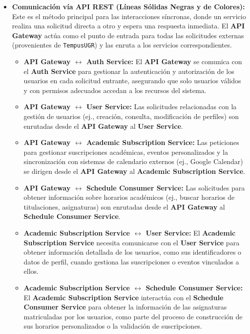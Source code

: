 \begin{itemize}
    \item \textbf{Comunicación vía API REST (Líneas Sólidas Negras y de Colores):}
    Este es el método principal para las interacciones síncronas, donde un servicio realiza una solicitud directa a otro y espera una respuesta inmediata. El \textbf{API Gateway} actúa como el punto de entrada para todas las solicitudes externas (provenientes de \texttt{TempusUGR}) y las enruta a los servicios correspondientes.
    \begin{itemize}
        \item \textbf{API Gateway $\leftrightarrow$ Auth Service:} El \textbf{API Gateway} se comunica con el \textbf{Auth Service} para gestionar la autenticación y autorización de los usuarios en cada solicitud entrante, asegurando que solo usuarios válidos y con permisos adecuados accedan a los recursos del sistema.
        \item \textbf{API Gateway $\leftrightarrow$ User Service:} Las solicitudes relacionadas con la gestión de usuarios (ej., creación, consulta, modificación de perfiles) son enrutadas desde el \textbf{API Gateway} al \textbf{User Service}.
        \item \textbf{API Gateway $\leftrightarrow$ Academic Subscription Service:} Las peticiones para gestionar suscripciones académicas, eventos personalizados y la sincronización con sistemas de calendario externos (ej., Google Calendar) se dirigen desde el \textbf{API Gateway} al \textbf{Academic Subscription Service}.
        \item \textbf{API Gateway $\leftrightarrow$ Schedule Consumer Service:} Las solicitudes para obtener información sobre horarios académicos (ej., buscar horarios de titulaciones, asignaturas) son enrutadas desde el \textbf{API Gateway} al \textbf{Schedule Consumer Service}.
        \item \textbf{Academic Subscription Service $\leftrightarrow$ User Service:} El \textbf{Academic Subscription Service} necesita comunicarse con el \textbf{User Service} para obtener información detallada de los usuarios, como sus identificadores o datos de perfil, cuando gestiona las suscripciones o eventos vinculados a ellos.
        \item \textbf{Academic Subscription Service $\leftrightarrow$ Schedule Consumer Service:} El \textbf{Academic Subscription Service} interactúa con el \textbf{Schedule Consumer Service} para obtener la información de las asignaturas matriculadas por los usuarios, como parte del proceso de construcción de sus horarios personalizados o la validación de suscripciones.
    \end{itemize}


\end{itemize}
